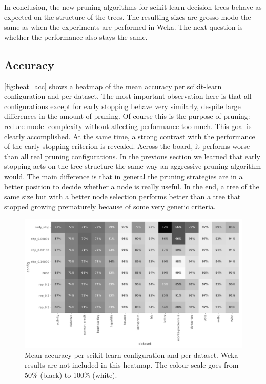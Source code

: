 In conclusion, the new pruning algorithms for scikit-learn decision trees behave as expected on the structure of the trees. The resulting sizes are grosso modo the same as when the experiments are performed in Weka. The next question is whether the performance also stays the same.

\subsection{Accuracy}
\autoref{fig:heat_acc} shows a heatmap of the mean accuracy per scikit-learn configuration and per dataset. The most important observation here is that all configurations except for early stopping behave very similarly, despite large differences in the amount of pruning. Of course this is the purpose of pruning: reduce model complexity without affecting performance too much. This goal is clearly accomplished. At the same time, a strong contrast with the performance of the early stopping criterion is revealed. Across the board, it performs worse than all real pruning configurations. In the previous section we learned that early stopping acts on the tree structure the same way an aggressive pruning algorithm would. The main difference is that in general the pruning strategies are in a better position to decide whether a node is really useful. In the end, a tree of the same size but with a better node selection performs better than a tree that stopped growing prematurely because of some very generic criteria.

\begin{figure}[htp]
    \includegraphics[width=\textwidth]{img/heatmap_accuracy.pdf}
    \caption{Mean accuracy per scikit-learn configuration and per dataset. Weka results are not included in this heatmap. The colour scale goes from 50\% (black) to 100\% (white).}%
    \label{fig:heat_acc}
\end{figure}

